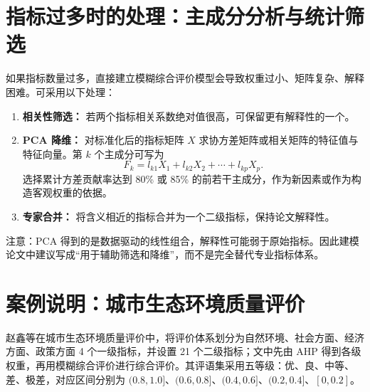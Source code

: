 \documentclass[UTF8,zihao=-4,fontset=none]{ctexart}
\begin{document}
\section{指标过多时的处理：主成分分析与统计筛选}
如果指标数量过多，直接建立模糊综合评价模型会导致权重过小、矩阵复杂、解释困难。可采用以下处理：
\begin{enumerate}[leftmargin=2.2em]
  \item \textbf{相关性筛选：} 若两个指标相关系数绝对值很高，可保留更有解释性的一个。
  \item \textbf{PCA 降维：} 对标准化后的指标矩阵 $X$ 求协方差矩阵或相关矩阵的特征值与特征向量。第 $k$ 个主成分可写为
  \begin{equation}
    F_k=l_{k1}X_1+l_{k2}X_2+\cdots+l_{kp}X_p.
  \end{equation}
  选择累计方差贡献率达到 80\% 或 85\% 的前若干主成分，作为新因素或作为构造客观权重的依据。
  \item \textbf{专家合并：} 将含义相近的指标合并为一个二级指标，保持论文解释性。
\end{enumerate}

注意：PCA 得到的是数据驱动的线性组合，解释性可能弱于原始指标。因此建模论文中建议写成“用于辅助筛选和降维”，而不是完全替代专业指标体系。

\section{案例说明：城市生态环境质量评价}
赵鑫等在城市生态环境质量评价中，将评价体系划分为自然环境、社会方面、经济方面、政策方面 4 个一级指标，并设置 21 个二级指标；文中先由 AHP 得到各级权重，再用模糊综合评价进行综合评价。其评语集采用五等级：优、良、中等、差、极差，对应区间分别为 $(0.8,1.0]$、$(0.6,0.8]$、$(0.4,0.6]$、$(0.2,0.4]$、$[0,0.2]$。
\end{document}

